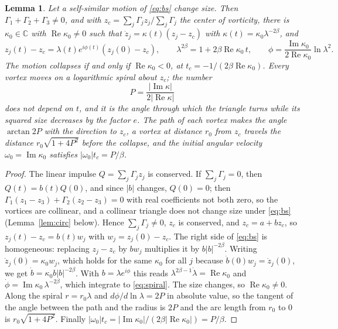 \documentclass[11pt]{article}
\newtheorem{lemma}{Lemma}
\theoremstyle{definition}
\newcommand{\re}{\operatorname{Re}}
\newcommand{\im}{\operatorname{Im}}
\newcommand{\C}{\mathbb{C}}
\begin{document}
\begin{lemma}\label{lem:ss}
Let a self-similar motion of \eqref{eq:bs} change size. Then $\Gamma_1 + \Gamma_2 + \Gamma_3 \ne 0$, and with $z_c = \sum_j \Gamma_j z_j/\sum_j \Gamma_j$ the center of vorticity, there is $\kappa_0 \in \C$ with $\re\kappa_0 \ne 0$ such that $\dot z_j = \kappa(t)(z_j - z_c)$ with $\kappa(t) = \kappa_0 \lambda^{-2\beta}$, and
\begin{equation}\label{eq:spiral}
z_j(t) - z_c = \lambda(t) e^{i\phi(t)} (z_j(0) - z_c), \qquad \lambda^{2\beta} = 1 + 2\beta \re\kappa_0\, t, \qquad \phi = \frac{\im\kappa_0}{2\re\kappa_0} \ln\lambda^2 .
\end{equation}
The motion collapses if and only if $\re\kappa_0 < 0$, at $t_c = -1/(2\beta\re\kappa_0)$. Every vortex moves on a logarithmic spiral about $z_c$; the number
\begin{equation}\label{eq:P}
P = \frac{|\im\kappa|}{2|\re\kappa|}
\end{equation}
does not depend on $t$, and it is the angle through which the triangle turns while its squared size decreases by the factor $e$. The path of each vortex makes the angle $\arctan 2P$ with the direction to $z_c$, a vortex at distance $r_0$ from $z_c$ travels the distance $r_0\sqrt{1 + 4P^2}$ before the collapse, and the initial angular velocity $\omega_0 = \im\kappa_0$ satisfies $|\omega_0| t_c = P/\beta$.
\end{lemma}

\begin{proof}
The linear impulse $Q = \sum_j \Gamma_j z_j$ is conserved. If $\sum_j \Gamma_j = 0$, then $Q(t) = b(t) Q(0)$, and since $|b|$ changes, $Q(0) = 0$; then $\Gamma_1(z_1 - z_3) + \Gamma_2(z_2 - z_3) = 0$ with real coefficients not both zero, so the vortices are collinear, and a collinear triangle does not change size under \eqref{eq:bs} (Lemma~\ref{lem:circ} below). Hence $\sum_j \Gamma_j \ne 0$, $z_c$ is conserved, and $z_c = a + b z_c$, so $z_j(t) - z_c = b(t) w_j$ with $w_j = z_j(0) - z_c$. The right side of \eqref{eq:bs} is homogeneous: replacing $z_j - z_c$ by $b w_j$ multiplies it by $b|b|^{-2\beta}$. Writing $\dot z_j(0) = \kappa_0 w_j$, which holds for the same $\kappa_0$ for all $j$ because $\dot b(0) w_j = \dot z_j(0)$, we get $\dot b = \kappa_0 b |b|^{-2\beta}$. With $b = \lambda e^{i\phi}$ this reads $\lambda^{2\beta - 1}\dot\lambda = \re\kappa_0$ and $\dot\phi = \im\kappa_0\,\lambda^{-2\beta}$, which integrate to \eqref{eq:spiral}. The size changes, so $\re\kappa_0 \ne 0$. Along the spiral $r = r_0\lambda$ and $d\phi/d\ln\lambda = 2P$ in absolute value, so the tangent of the angle between the path and the radius is $2P$ and the arc length from $r_0$ to $0$ is $r_0\sqrt{1 + 4P^2}$. Finally $|\omega_0| t_c = |\im\kappa_0|/(2\beta|\re\kappa_0|) = P/\beta$.
\end{proof}
\end{document}
